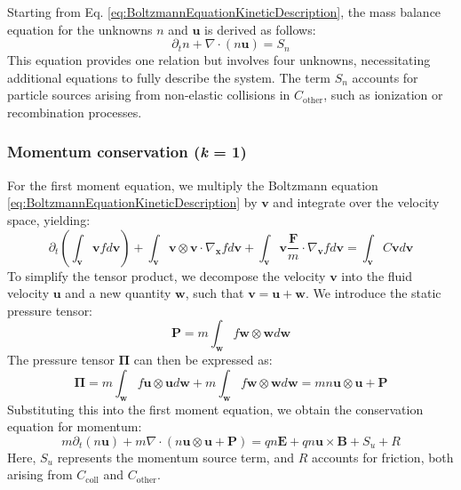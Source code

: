 Starting from Eq. \ref{eq:BoltzmannEquationKineticDescription}, the mass balance equation for the unknowns $n$ and $\mathbf{u}$ is derived as follows:
\begin{equation}
	\label{eq:ZeroMomentTransportEquation}
	\partial_t n + \nabla \cdot (n\mathbf{u}) = S_n
\end{equation}
This equation provides one relation but involves four unknowns, necessitating additional equations to fully describe the system. The term $S_n$ accounts for particle sources arising from non-elastic collisions in $C_{\text{other}}$, such as ionization or recombination processes.

\subsubsection{Momentum conservation (\textit{k} = 1)}

For the first moment equation, we multiply the Boltzmann equation \ref{eq:BoltzmannEquationKineticDescription} by $\mathbf{v}$ and integrate over the velocity space, yielding:
\begin{equation}
	\partial_t \left( \int_\mathbf{v} \mathbf{v} f d\mathbf{v} \right) + \int_\mathbf{v} \mathbf{v} \otimes \mathbf{v} \cdot \nabla_{\mathbf{x}} f d\mathbf{v} + \int_\mathbf{v} \mathbf{v} \frac{\mathbf{F}}{m} \cdot \nabla_{\mathbf{v}} f d\mathbf{v} = \int_\mathbf{v} C \mathbf{v} d\mathbf{v}
\end{equation}
To simplify the tensor product, we decompose the velocity $\mathbf{v}$ into the fluid velocity $\mathbf{u}$ and a new quantity $\mathbf{w}$, such that $\mathbf{v} = \mathbf{u} + \mathbf{w}$. We introduce the static pressure tensor:
\begin{equation}
	\boldsymbol{P} = m \int_\mathbf{w} f \mathbf{w} \otimes \mathbf{w} d\mathbf{w}
\end{equation}
The pressure tensor $\boldsymbol{\Pi}$ can then be expressed as:
\begin{equation}
	\boldsymbol{\Pi} = m \int_\mathbf{w} f \mathbf{u} \otimes \mathbf{u} d\mathbf{w} + m \int_\mathbf{w} f \mathbf{w} \otimes \mathbf{w} d\mathbf{w} = mn \mathbf{u} \otimes \mathbf{u} + \boldsymbol{P}
\end{equation}
Substituting this into the first moment equation, we obtain the conservation equation for momentum:
\begin{equation}
	\label{eq:FirstMomentTransportEquation}
	m \partial_t (n \mathbf{u}) + m \nabla \cdot \left( n \mathbf{u} \otimes \mathbf{u} + \boldsymbol{P} \right) = qn \mathbf{E} + qn \mathbf{u} \times \mathbf{B} + S_u + R
\end{equation}
Here, $S_u$ represents the momentum source term, and $R$ accounts for friction, both arising from $C_{\text{coll}}$ and $C_{\text{other}}$.

